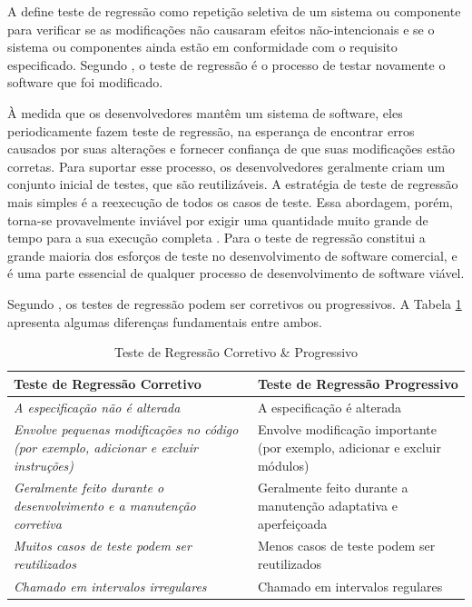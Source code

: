  A  define teste de regressão como repetição seletiva de um sistema ou componente para verificar se as modificações não causaram efeitos não-intencionais e se o sistema ou componentes ainda estão em conformidade com o requisito especificado. Segundo , o teste de regressão é o processo de testar novamente o software que foi modificado. 
 
 À medida que os desenvolvedores mantêm um sistema de software, eles periodicamente fazem teste de regressão, na esperança de encontrar erros causados por suas alterações e fornecer confiança de que suas modificações estão corretas. Para suportar esse processo, os desenvolvedores geralmente criam um conjunto inicial de testes, que são reutilizáveis. A estratégia de teste de regressão mais simples é a reexecução de todos os casos de teste. Essa abordagem, porém, torna-se provavelmente inviável por exigir uma quantidade muito grande de tempo para a sua execução completa \cite{Graves:2001:ESR:367008.367020}. Para  o teste de regressão constitui a grande maioria dos esforços de teste no desenvolvimento de software comercial, e é uma parte essencial de qualquer processo de desenvolvimento de software viável.
 
 Segundo , os testes de regressão podem ser corretivos ou progressivos. A Tabela \ref{table:TRCP} apresenta algumas diferenças fundamentais entre ambos.

 
\begin{table}[th]
    \footnotesize
    \centering
    \caption{Teste de Regressão Corretivo \& Progressivo \cite{LEUNG1989}}
    \label{table:TRCP}
    \def \arraystretch{1.3}
    \begin{tabular}{m{6.5cm}m{6.5cm}}
        \toprule
        \textbf{Teste de Regressão Corretivo} & \textbf{Teste de Regressão Progressivo} \\
        \midrule
        \textit{A especificação não é alterada} & A especificação é alterada\\
        \textit{Envolve pequenas modificações no código (por exemplo, adicionar e excluir instruções)} & Envolve modificação importante (por exemplo, adicionar e excluir módulos)\\ 
        \textit{Geralmente feito durante o desenvolvimento e a manutenção corretiva} & Geralmente feito durante a manutenção adaptativa e aperfeiçoada\\
        \textit{Muitos casos de teste podem ser reutilizados} & Menos casos de teste podem ser reutilizados\\
        \textit{Chamado em intervalos irregulares} & Chamado em intervalos regulares\\
        \bottomrule
    \end{tabular}
\end{table}

